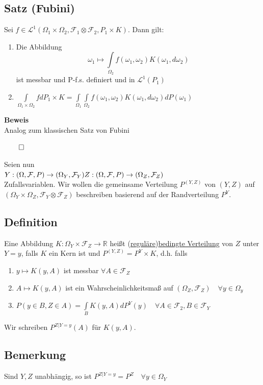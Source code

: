 \documentclass[german,10pt,oneside, fleqn, a4paper]{article}
\newcommand {\R}	{\mathbb{R}}
\newcommand{\ra}{\rightarrow}
\newcommand{\brc}[1]{\left(#1\right)}
\newcommand{\QED}{\begin{flushright}$\qed$\end{flushright}}
\newcommand{\mc}[1]{\mathcal{#1}}
\newcommand{\lp}[1]{\mc{L}^{#1}}
\newcommand{\beweis}{\textbf{Beweis}\\}
\newcommand{\1}[1]{1_{#1}}
\newcommand{\2}[1]{\1{\brac{#1}}}
\newcommand{\raum}{\brc{\Omega,\mc{F},P}}
\newcommand{\f}{\mc{F}}
\newcommand{\qf}{\quad\forall}
\begin{document}
\subsection{Satz (Fubini)}
\label{7.3}
\label{Fubini}
Sei $f\in\lp{1}(\Omega_1\times\Omega_2,\f_1\otimes\f_2,P_1\times K)$. Dann gilt: \begin{enumerate}[label=(\roman*)]
\item Die Abbildung \[
\omega_1\mapsto\int\limits_{\Omega_2}f(\omega_1,\omega_2)K(\omega_1,d\omega_2)\]
ist messbar und P-f.s. definiert und in $\lp{1}(P_1)$
\item $\int\limits_{\Omega_1\times\Omega_2}fdP_1\times K=\int\limits_{\Omega_1}\int\limits_{\Omega_2}f(\omega_1,\omega_2)K(\omega_1,d\omega_2)dP(\omega_1)$
\end{enumerate}
\beweis
Analog zum klassischen Satz von Fubini\QED






Seien nun \\
$Y:\raum\ra(\Omega_Y,\f_Y)\\
Z:\raum\ra(\Omega_Z,\f_Z)$\\
Zufallsvariablen. Wir wollen die gemeinsame Verteilung $P^{(Y,Z)}$ von $(Y,Z)$ auf $(\Omega_Y\times\Omega_Z,\f_Y\otimes\f_Z)$ beschreiben basierend auf der Randverteilung $P^Y$.

\subsection{Definition}
\label{7.4}
Eine Abbildung $K:\Omega_Y\times\f_Z\ra\R$ heißt (\underline{reguläre})\underline{bedingte Verteilung} von $Z$ unter $Y=y$, falls $K$ ein Kern ist und $P^{(Y,Z)}=P^Y\times K$, d.h. falls\begin{enumerate}[label=(\roman*)]
\item $y\mapsto K(y,A)$ ist messbar $\forall A\in\f_Z$
\item $A\mapsto K(y,A)$ ist ein Wahrscheinlichkeitsmaß auf $(\Omega_Z,\f_Z)\qf y\in\Omega_y$
\item $P(y\in B,Z\in A)=\int\limits_BK(y,A)dP^Y(y)\qf A\in\f_2,B\in\f_Y$
\end{enumerate}
Wir schreiben $P^{Z|Y=y}(A)$ für $K(y,A)$.

\subsection{Bemerkung}
\label{7.5}
Sind $Y,Z$ unabhängig, so ist $P^{Z|Y=y}=P^Z\qf y\in\Omega_Y$
\end{document}
